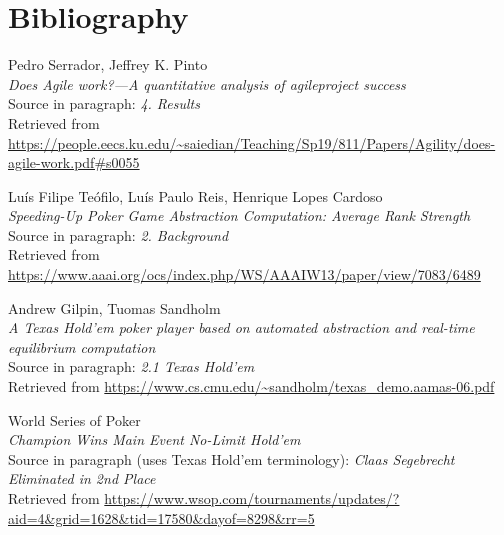 \documentclass[11pt]{article}
\begin{document}
\newpage
\section{Bibliography}
\renewcommand\refname{}
\begin{thebibliography}{9}
\hypertarget{agile_success}{}
\begin{flushleft}
	Pedro Serrador, Jeffrey K. Pinto \\
	\textit{Does Agile work?—A quantitative analysis of agileproject success} \\
	Source in paragraph: \textit{4. Results} \\
	Retrieved from \url{https://people.eecs.ku.edu/~saiedian/Teaching/Sp19/811/Papers/Agility/does-agile-work.pdf#s0055}
\end{flushleft}


\begin{flushleft}
\hypertarget{lookup}{}
	Luís Filipe Teófilo, Luís Paulo Reis, Henrique Lopes Cardoso \\
	\textit{Speeding-Up Poker Game Abstraction Computation: Average Rank Strength} \\
	Source in paragraph: \textit{2. Background} \\
	Retrieved from \url{https://www.aaai.org/ocs/index.php/WS/AAAIW13/paper/view/7083/6489}
\end{flushleft}

\begin{flushleft}
\hypertarget{research_texas}{}
	Andrew Gilpin, Tuomas Sandholm \\
	\textit{A Texas Hold’em poker player based on automated abstraction and real-time equilibrium computation} \\
	Source in paragraph: \textit{2.1 Texas Hold'em} \\
	Retrieved from \url{https://www.cs.cmu.edu/~sandholm/texas_demo.aamas-06.pdf}
\end{flushleft}


\hypertarget{wsop_texas}{}
\begin{flushleft}
	World Series of Poker \\
	\textit{Champion Wins Main Event No-Limit Hold'em} \\
	Source in paragraph (uses Texas Hold'em terminology): \textit{Claas Segebrecht Eliminated in 2nd Place} \\
	Retrieved from \url{https://www.wsop.com/tournaments/updates/?aid=4&grid=1628&tid=17580&dayof=8298&rr=5}
\end{flushleft}


\end{thebibliography}
\end{document}
